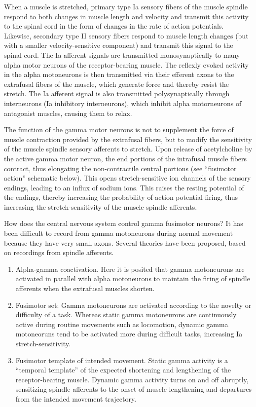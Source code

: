 \documentclass[]{book}
\providecommand{\tightlist}{%
  \setlength{\itemsep}{0pt}\setlength{\parskip}{0pt}}
\begin{document}
When a muscle is stretched, primary type Ia sensory fibers of the muscle spindle respond to both changes in muscle length and velocity and transmit this activity to the spinal cord in the form of changes in the rate of action potentials. Likewise, secondary type II sensory fibers respond to muscle length changes (but with a smaller velocity-sensitive component) and transmit this signal to the spinal cord. The Ia afferent signals are transmitted monosynaptically to many alpha motor neurons of the receptor-bearing muscle. The reflexly evoked activity in the alpha motoneurons is then transmitted via their efferent axons to the extrafusal fibers of the muscle, which generate force and thereby resist the stretch. The Ia afferent signal is also transmitted polysynaptically through interneurons (Ia inhibitory interneurons), which inhibit alpha motorneurons of antagonist muscles, causing them to relax.

The function of the gamma motor neurons is not to supplement the force of muscle contraction provided by the extrafusal fibers, but to modify the sensitivity of the muscle spindle sensory afferents to stretch. Upon release of acetylcholine by the active gamma motor neuron, the end portions of the intrafusal muscle fibers contract, thus elongating the non-contractile central portions (see ``fusimotor action'' schematic below). This opens stretch-sensitive ion channels of the sensory endings, leading to an influx of sodium ions. This raises the resting potential of the endings, thereby increasing the probability of action potential firing, thus increasing the stretch-sensitivity of the muscle spindle afferents.

How does the central nervous system control gamma fusimotor neurons? It has been difficult to record from gamma motoneurons during normal movement because they have very small axons. Several theories have been proposed, based on recordings from spindle afferents.

\begin{enumerate}
\def\labelenumi{\arabic{enumi}.}
\tightlist
\item
  Alpha-gamma coactivation. Here it is posited that gamma motoneurons are activated in parallel with alpha motoneurons to maintain the firing of spindle afferents when the extrafusal muscles shorten.
\item
  Fusimotor set: Gamma motoneurons are activated according to the novelty or difficulty of a task. Whereas static gamma motoneurons are continuously active during routine movements such as locomotion, dynamic gamma motoneoruns tend to be activated more during difficult tasks, increasing Ia stretch-sensitivity.
\item
  Fusimotor template of intended movement. Static gamma activity is a ``temporal template'' of the expected shortening and lengthening of the receptor-bearing muscle. Dynamic gamma activity turns on and off abruptly, sensitizing spindle afferents to the onset of muscle lengthening and departures from the intended movement trajectory.
\end{enumerate}
\end{document}
